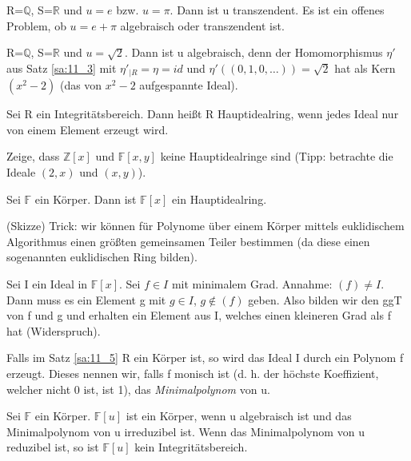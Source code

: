 \documentclass[10pt]{scrbook}
\begin{document}
\begin{Bsp}
R=$\mathbb{Q}$, S=$\mathbb{R}$ und $u=e$ bzw. $u=\pi$. Dann ist u transzendent. Es ist ein offenes Problem, ob $u=e+\pi$ algebraisch oder transzendent ist.
\end{Bsp}

\begin{Bsp}
R=$\mathbb{Q}$, S=$\mathbb{R}$ und $u=\sqrt{2}$. Dann ist u algebraisch, denn der Homomorphismus $\eta'$ aus Satz \ref{sa:11_3} mit $\eta'_{|R}=\eta=
id$ und $\eta'((0, 1, 0, \ldots))=\sqrt{2}$ hat als Kern $(x^2-2)$ (das von $x^2-2$ aufgespannte Ideal).
\end{Bsp}

\begin{Def}
Sei R ein Integritätsbereich. Dann heißt R Hauptidealring, wenn jedes Ideal nur von einem Element erzeugt wird.
\end{Def}

\begin{Auf}
Zeige, dass $\mathbb{Z}[x]$ und $\mathbb{F}[x, y]$ keine Hauptidealringe sind (Tipp: betrachte die Ideale $(2, x)$ und $(x, y)$).
\end{Auf}

\begin{Sa}
Sei $\mathbb{F}$ ein Körper. Dann ist $\mathbb{F}[x]$ ein Hauptidealring.
\end{Sa}
\begin{bew}
(Skizze) Trick: wir können für Polynome über einem Körper mittels euklidischem Algorithmus einen größten gemeinsamen Teiler bestimmen (da diese einen sogenannten euklidischen Ring bilden).

Sei I ein Ideal in $\mathbb{F}[x]$. Sei $f\in I$ mit minimalem Grad. Annahme: $(f)\neq I$. Dann muss es ein Element g mit $g\in I$, $g\notin (f)$ geben. Also bilden wir den ggT von f und g und erhalten ein Element aus I, welches einen kleineren Grad als f hat (Widerspruch).
\end{bew}

\begin{Def}
Falls im Satz \ref{sa:11_5} R ein Körper ist, so wird das Ideal I durch ein Polynom f erzeugt. Dieses nennen wir, falls f monisch ist (d. h. der höchste Koeffizient, welcher nicht 0 ist, ist 1), das \emph{Minimalpolynom} von u.
\end{Def}

\begin{Sa}
Sei $\mathbb{F}$ ein Körper. $\mathbb{F}[u]$ ist ein Körper, wenn u algebraisch ist und das Minimalpolynom von u irreduzibel ist. Wenn das Minimalpolynom von u reduzibel ist, so ist $\mathbb{F}[u]$ kein Integritätsbereich.
\end{Sa}
\end{document}
